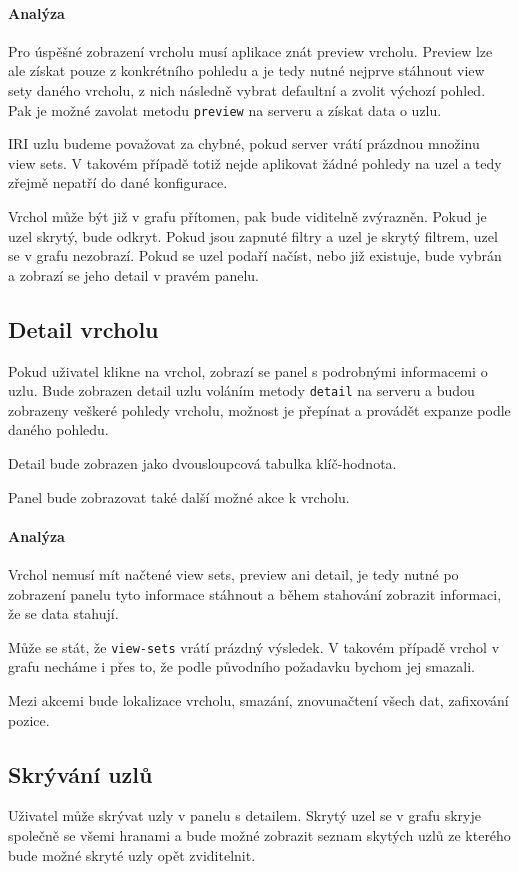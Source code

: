 \paragraph{Analýza} Pro úspěšné zobrazení vrcholu musí aplikace znát preview vrcholu. Preview lze ale získat pouze z konkrétního pohledu a je tedy nutné nejprve stáhnout view sety daného vrcholu, z nich následně vybrat defaultní a zvolit výchozí pohled. Pak je možné zavolat metodu \texttt{preview} na serveru a získat data o uzlu.

IRI uzlu budeme považovat za chybné, pokud server vrátí prázdnou množinu view sets. V takovém případě totiž nejde aplikovat žádné pohledy na uzel a tedy zřejmě nepatří do dané konfigurace.

Vrchol může být již v grafu přítomen, pak bude viditelně zvýrazněn. Pokud je uzel skrytý, bude odkryt. Pokud jsou zapnuté filtry a uzel je skrytý filtrem, uzel se v grafu nezobrazí. Pokud se uzel podaří načíst, nebo již existuje, bude vybrán a zobrazí se jeho detail v pravém panelu.

\subsection{Detail vrcholu}
Pokud uživatel klikne na vrchol, zobrazí se panel s podrobnými informacemi o uzlu. Bude zobrazen detail uzlu voláním metody \texttt{detail} na serveru a budou zobrazeny veškeré pohledy vrcholu, možnost je přepínat a provádět expanze podle daného pohledu.

Detail bude zobrazen jako dvousloupcová tabulka klíč-hodnota.

Panel bude zobrazovat také další možné akce k vrcholu.

\paragraph{Analýza} Vrchol nemusí mít načtené view sets, preview ani detail, je tedy nutné po zobrazení panelu tyto informace stáhnout a během stahování zobrazit informaci, že se data stahují.

Může se stát, že \texttt{view-sets} vrátí prázdný výsledek. V takovém případě vrchol v grafu necháme i přes to, že podle původního požadavku bychom jej smazali.

Mezi akcemi bude lokalizace vrcholu, smazání, znovunačtení všech dat, zafixování pozice.

\subsection{Skrývání uzlů}
Uživatel může skrývat uzly v panelu s detailem. Skrytý uzel se v grafu skryje společně se všemi hranami a bude možné zobrazit seznam skytých uzlů ze kterého bude možné skryté uzly opět zviditelnit.

